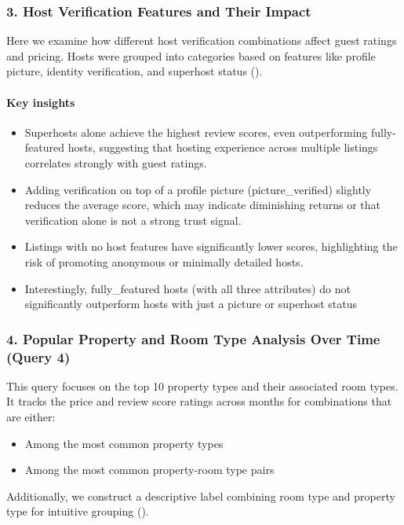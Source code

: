 \subsubsection*{3. Host Verification Features and Their Impact}

Here we examine how different host verification combinations affect guest ratings and pricing. Hosts were grouped into categories based on features like profile picture, identity verification, and superhost status ().

\vspace{0.5em}
\paragraph{Key insights}
\begin{itemize}
    \item Superhosts alone achieve the highest review scores, even outperforming fully-featured hosts, suggesting that hosting experience across multiple listings correlates strongly with guest ratings.
    \item Adding verification on top of a profile picture (picture\_verified) slightly reduces the average score, which may indicate diminishing returns or that verification alone is not a strong trust signal.
    \item Listings with no host features have significantly lower scores, highlighting the risk of promoting anonymous or minimally detailed hosts.
    \item Interestingly, fully\_featured hosts (with all three attributes) do not significantly outperform hosts with just a picture or superhost status
\end{itemize}


\subsubsection*{4. Popular Property and Room Type Analysis Over Time (Query 4)}

This query focuses on the top 10 property types and their associated room types. It tracks the price and review score ratings across months for combinations that are either:
\begin{itemize}
    \item Among the most common property types
    \item Among the most common property-room type pairs
\end{itemize}

Additionally, we construct a descriptive label combining room type and property type for intuitive grouping ().

